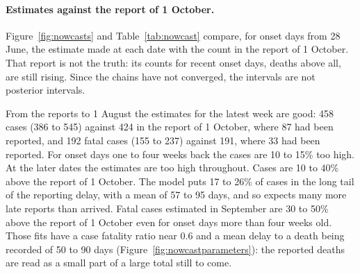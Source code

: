 \documentclass[11pt,a4paper]{article}
\begin{document}
\paragraph{Estimates against the report of 1 October.}
Figure~\ref{fig:nowcasts} and Table~\ref{tab:nowcast} compare, for onset
days from 28 June, the estimate made at each date with the count in the
report of 1 October. That report is not the truth: its counts for recent
onset days, deaths above all, are still rising. Since the chains have not
converged, the intervals are not posterior intervals.

From the reports to 1 August the estimates for the latest week are good:
458 cases (386 to 545) against 424 in the report of 1 October, where 87 had
been reported, and 192 fatal cases (155 to 237) against 191, where 33 had
been reported. For onset days one to four weeks back the cases are 10 to
15\% too high. At the later dates the estimates are too high throughout.
Cases are 10 to 40\% above the report of 1 October. The model puts 17 to
26\% of cases in the long tail of the reporting delay, with a mean of 57 to
95 days, and so expects many more late reports than arrived. Fatal cases
estimated in September are 30 to 50\% above the report of 1 October even
for onset days more than four weeks old. Those fits have a case fatality
ratio near 0.6 and a mean delay to a death being recorded of 50 to 90 days
(Figure~\ref{fig:nowcastparameters}): the reported deaths are read as a
small part of a large total still to come.
\end{document}
